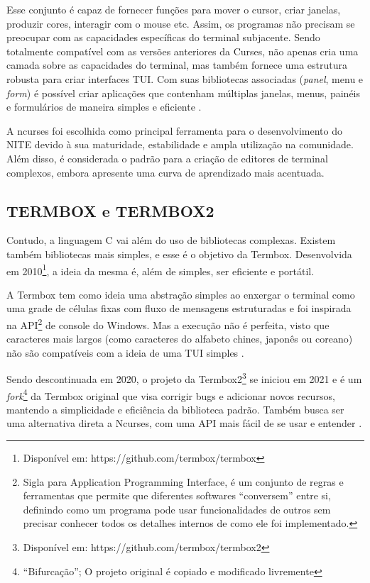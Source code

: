 Esse conjunto é capaz de fornecer funções para mover o cursor,
criar janelas, produzir cores, interagir com o mouse etc. Assim, os programas não
precisam se preocupar com as capacidades específicas do terminal subjacente.
Sendo totalmente compatível com as versões anteriores da Curses, não apenas cria
uma camada sobre as capacidades do terminal, mas também fornece uma estrutura
robusta para criar interfaces TUI. Com suas bibliotecas associadas
(\textit{panel}, menu e \textit{form}) é possível criar aplicações que contenham
múltiplas janelas, menus, painéis e formulários de maneira simples e eficiente
\cite{ncurses_howto}.

A ncurses foi escolhida como principal ferramenta para o desenvolvimento
do NITE devido à sua maturidade, estabilidade e ampla utilização na comunidade. Além
disso, é considerada o padrão para a criação de editores de terminal complexos, embora
apresente uma curva de aprendizado mais acentuada.

\subsection{TERMBOX e TERMBOX2}

Contudo, a linguagem C vai além do uso de bibliotecas complexas. Existem também bibliotecas
mais simples, e esse é o objetivo da Termbox. Desenvolvida em 2010\footnote{Disponível
em: https://github.com/termbox/termbox}, a ideia da mesma é, além de simples, ser
eficiente e portátil.

A Termbox tem como ideia uma abstração simples ao enxergar o terminal como uma grade
de células fixas com fluxo de mensagens estruturadas e foi inspirada na API\footnote{Sigla
para Application Programming Interface, é um conjunto de regras e ferramentas que
permite que diferentes softwares “conversem” entre si, definindo como um
programa pode usar funcionalidades de outros sem precisar conhecer todos os
detalhes internos de como ele foi implementado.} de console do Windows. Mas a execução
não é perfeita, visto que caracteres mais largos (como caracteres do alfabeto chines,
japonês ou coreano) não são compatíveis com a ideia de uma TUI simples \cite{termbox_googlecode}.

Sendo descontinuada em 2020, o projeto da Termbox2\footnote{Disponível em: https://github.com/termbox/termbox2}
se iniciou em 2021 e é um \textit{fork}\footnote{``Bifurcação''; O projeto original
é copiado e modificado livremente} da Termbox original que visa corrigir bugs e
adicionar novos recursos, mantendo a simplicidade e eficiência da biblioteca padrão.
Também busca ser uma alternativa direta a Ncurses, com uma API mais fácil de se usar
e entender \cite{termbox2_github}.

